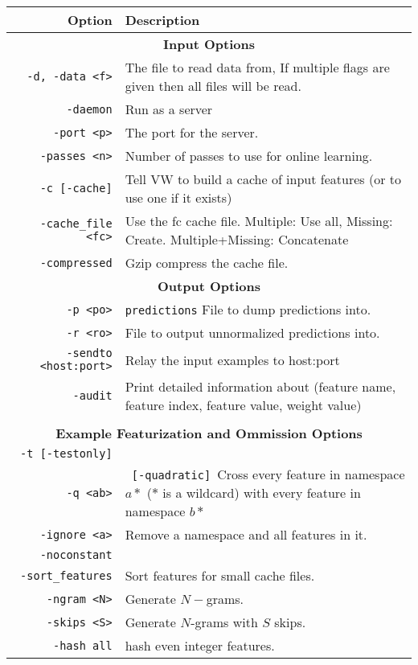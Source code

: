 \documentclass[preview,border={30 30 30 30}]{standalone}
\begin{document}
\begin{tabular}{r|p{8cm}}
    Option & Description \\\hline
    \multicolumn{2}{c}{\textbf{Input Options}}\\\hline
    \verb|-d, -data <f>| & The file to read data from, If multiple flags are given then all files will be read. \\
    \verb|-daemon|&Run as a server\\
    \verb|-port <p>|&The port for the server.\\
    \verb|-passes <n>|&Number of passes to use for online learning.\\
    \verb|-c [-cache]|&Tell VW to build a cache of input features (or to use one if it exists)\\
    \verb|-cache_file <fc>|&Use the fc cache file. Multiple: Use all, Missing: Create. Multiple+Missing: Concatenate\\
    \verb|-compressed|& Gzip compress the cache file.\\\hline
    \multicolumn{2}{c}{\textbf{Output Options}}\\\hline
    \verb|-p <po>|&\verb|predictions| File to dump predictions into.\\
    \verb|-r <ro>|&File to output unnormalized predictions into.\\
    \verb|-sendto <host:port>|&Relay the input examples to host:port\\
    \verb|-audit|&Print detailed information about (feature name, feature index, feature value, weight value)\\
    \verb||&\\\hline
    \multicolumn{2}{c}{\textbf{Example Featurization and Ommission Options}}\\\hline
    \verb|-t [-testonly]|&\\
    \verb|-q <ab>|& \verb| [-quadratic] |Cross every feature in namespace $a*$ ($*$ is a wildcard) with every feature in namespace $b*$\\
    \verb|-ignore <a>|&Remove a namespace and all features in it.\\
    \verb|-noconstant|&\\
    \verb|-sort_features|&Sort features for small cache files.\\
    \verb|-ngram <N>|&Generate $N-$grams.\\
    \verb|-skips <S>|&Generate $N$-grams with $S$ skips.\\
    \verb|-hash all|& hash even integer features.\\\hline

\end{tabular}
\end{document}

